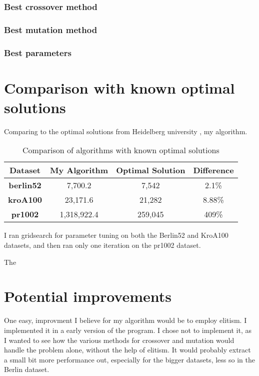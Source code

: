 \documentclass[11pt]{scrartcl} %
\begin{document}
\subsubsection{Best crossover method}

\subsubsection{Best mutation method}

\subsubsection{Best parameters}



\section{Comparison with known optimal solutions}
\label{Comparison with known optimal solutions}

Comparing to the optimal solutions from Heidelberg university \cite{heidelberg_university_best_known}, my algorithm.

\begin{table}[h!]
\centering
\begin{tabular}{|c|c|c|c|}
\hline
\textbf{Dataset} & \textbf{My Algorithm} & \textbf{Optimal Solution} & \textbf{Difference} \\ \hline
\textbf{berlin52} & 7,700.2 & 7,542 & 2.1\% \\ \hline
\textbf{kroA100} & 23,171.6 & 21,282 & 8.88\% \\ \hline
\textbf{pr1002} & 1,318,922.4 & 259,045 & 409\% \\ \hline
\end{tabular}
\caption{Comparison of algorithms with known optimal solutions}
\label{tab:comparison}
\end{table}

I ran gridsearch for parameter tuning on both the Berlin52 and KroA100 datasets, and then ran only one iteration on the pr1002 dataset.

The 


\section{Potential improvements}
\label{Potential improvements}
One easy, improvment I believe for my algorithm would be to employ elitism.
I implemented it in a early version of the program. I chose not to implement it, as I wanted to see how the various methods for crossover and mutation would handle the problem alone, without the help of elitism.
It would probably extract a small bit more performance out, especially for the bigger datasets, less so in the Berlin dataset.
\end{document}
